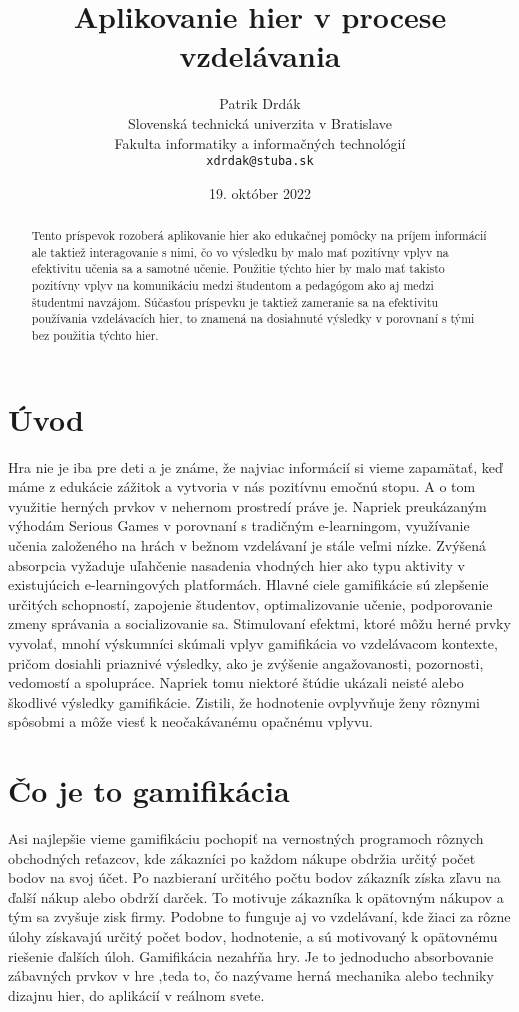 \documentclass[10pt,twoside,slovak,a4paper]{article}
\title{Aplikovanie hier v procese vzdelávania
} %
\author{Patrik Drdák\\[2pt]
	{\small Slovenská technická univerzita v Bratislave}\\
	{\small Fakulta informatiky a informačných technológií}\\
	{\small \texttt{xdrdak@stuba.sk}}
	}
\date{\small 19. október 2022} %
\begin{document}
\maketitle

\begin{abstract}
Tento príspevok rozoberá aplikovanie hier
ako edukačnej pomôcky na príjem informácií ale taktiež interagovanie s nimi,
čo vo výsledku by malo mať pozitívny vplyv na efektivitu učenia sa a samotné
učenie. Použitie týchto hier by malo mať takisto pozitívny vplyv na komunikáciu medzi študentom a pedagógom ako aj medzi študentmi navzájom. Súčasťou príspevku je taktiež zameranie sa na efektivitu používania vzdelávacích hier, to znamená na dosiahnuté výsledky v porovnaní s tými bez použitia týchto hier.

\end{abstract}



\section{Úvod}

Hra nie je iba pre deti a je známe, že najviac informácií si vieme zapamätať, keď máme z edukácie zážitok a vytvoria v nás pozitívnu emočnú stopu. A o tom využitie herných prvkov v nehernom prostredí práve je. Napriek preukázaným výhodám Serious Games v porovnaní s tradičným e-learningom, využívanie učenia založeného na hrách
v bežnom vzdelávaní je stále veľmi nízke. Zvýšená absorpcia
vyžaduje uľahčenie nasadenia vhodných hier ako typu aktivity
v existujúcich e-learningových platformách. Hlavné ciele gamifikácie sú zlepšenie určitých schopností, zapojenie študentov, optimalizovanie učenie, podporovanie zmeny správania a socializovanie sa. Stimulovaní efektmi, ktoré môžu herné prvky vyvolať, mnohí výskumníci skúmali vplyv gamifikácia vo vzdelávacom kontexte, pričom dosiahli priaznivé výsledky, ako je zvýšenie angažovanosti, pozornosti, vedomostí a spolupráce. Napriek tomu niektoré štúdie ukázali neisté alebo škodlivé výsledky gamifikácie. Zistili, že hodnotenie ovplyvňuje ženy rôznymi spôsobmi a môže viesť k neočakávanému opačnému vplyvu.

\section{Čo je to gamifikácia}
Asi najlepšie vieme gamifikáciu pochopiť na vernostných programoch rôznych obchodných reťazcov, kde zákazníci po každom nákupe obdržia určitý počet bodov na svoj účet.\cite{jakub-Framework} Po nazbieraní určitého počtu bodov zákazník získa zľavu na ďalší nákup alebo obdrží darček. To motivuje zákazníka k opätovným nákupov a tým sa zvyšuje zisk firmy. Podobne to funguje aj vo vzdelávaní, kde žiaci za rôzne úlohy získavajú určitý počet bodov, hodnotenie, a sú motivovaný k opätovnému riešenie ďalších úloh.  Gamifikácia nezahŕňa hry. Je to jednoducho absorbovanie zábavných prvkov v hre ,teda to, čo nazývame herná mechanika  alebo techniky dizajnu hier, do aplikácií v reálnom svete.
\end{document}
